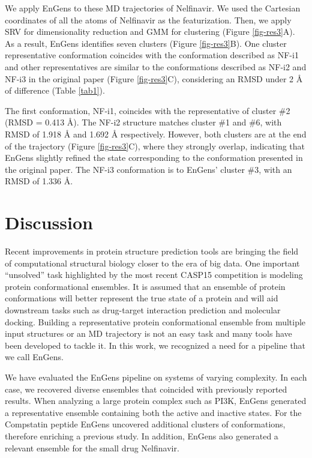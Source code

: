 \documentclass[numsec,webpdf,contemporary,large]{oup-authoring-template}
\theoremstyle{thmstyleone}%
\theoremstyle{thmstyletwo}%
\theoremstyle{thmstylethree}%
\begin{document}
 We apply EnGens to these MD trajectories of Nelfinavir. We used the Cartesian coordinates of all the atoms of Nelfinavir as the featurization. Then, we apply SRV for dimensionality reduction and GMM for clustering (Figure \ref{fig-res3}A). As a result, EnGens identifies seven clusters (Figure \ref{fig-res3}B). One cluster representative conformation coincides with the conformation described as NF-i1 and other representatives are similar to the conformations described as NF-i2 and NF-i3 in the original paper (Figure \ref{fig-res3}C), considering an RMSD under 2 Å of difference (Table \ref{tab1}).
 
The first conformation, NF-i1, coincides with the representative of cluster \#2 (RMSD = 0.413 Å). The NF-i2 structure matches cluster \#1 and \#6, with RMSD of 1.918 Å and 1.692 Å respectively. However, both clusters are at the end of the trajectory (Figure \ref{fig-res3}C), where they strongly overlap, indicating that EnGens slightly refined the state corresponding to the conformation presented in the original paper. The NF-i3 conformation is to EnGens' cluster \#3, with an RMSD of 1.336 Å.

\section{Discussion}

Recent improvements in protein structure prediction tools are bringing the field of computational structural biology closer to the era of big data. One important “unsolved” task highlighted by the most recent CASP15 competition is modeling protein conformational ensembles. It is assumed that an ensemble of protein conformations will better represent the true state of a protein and will aid downstream tasks such as drug-target interaction prediction and molecular docking. Building a representative protein conformational ensemble from multiple input structures or an MD trajectory is not an easy task and many tools have been developed to tackle it. In this work, we recognized a need for a pipeline that we call EnGens. 

We have evaluated the EnGens pipeline on systems of varying complexity. In each case, we recovered diverse ensembles that coincided with previously reported results. When analyzing a large protein complex such as PI3K, EnGens generated a representative ensemble containing both the active and inactive states.  For the Compstatin peptide EnGens uncovered additional clusters of conformations, therefore enriching a previous study. In addition, EnGens also generated a relevant ensemble for the small drug Nelfinavir. 
\end{document}
